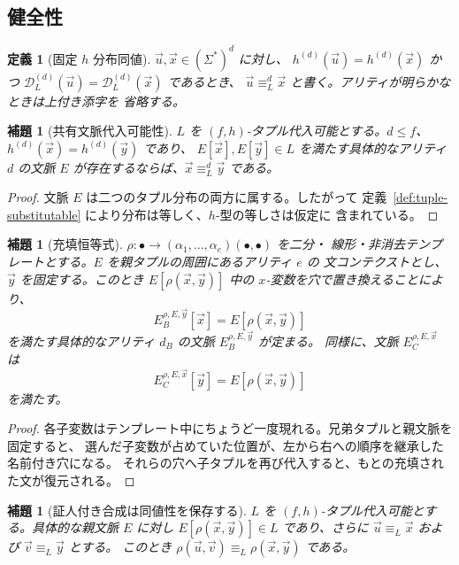 \documentclass[11pt,a4paper]{ltjsarticle}
\newtheorem{lemma}[theorem]{補題}
\newtheorem{definition}[theorem]{定義}
\theoremstyle{remark}
\newcommand{\D}{\mathcal{D}}
\newcommand{\tuple}[1]{\vec{#1}}
\begin{document}
\subsection{健全性}
\label{sec:soundness}

\begin{definition}[固定 \(h\) 分布同値]
\label{def:distributional-equivalence}
\(\tuple u,\tuple x\in(\Sigma^*)^d\) に対し、
\(h^{(d)}(\tuple u)=h^{(d)}(\tuple x)\) かつ
\(\D_L^{(d)}(\tuple u)=\D_L^{(d)}(\tuple x)\) であるとき、
\(\tuple u\equiv_L^d\tuple x\) と書く。アリティが明らかなときは上付き添字を
省略する。
\end{definition}

\begin{lemma}[共有文脈代入可能性]
\label{lem:shared-context}
\(L\) を \((f,h)\)-タプル代入可能とする。\(d\le f\)、
\(h^{(d)}(\tuple x)=h^{(d)}(\tuple y)\) であり、
\(E[\tuple x],E[\tuple y]\in L\) を満たす具体的なアリティ \(d\) の文脈 \(E\)
が存在するならば、\(\tuple x\equiv_L^d\tuple y\) である。
\end{lemma}

\begin{proof}
文脈 \(E\) は二つのタプル分布の両方に属する。したがって
定義~\ref{def:tuple-substitutable} により分布は等しく、\(h\)-型の等しさは仮定に
含まれている。
\end{proof}

\begin{lemma}[充填恒等式]
\label{lem:filling-identity}
\(\rho\colon\bullet\to(\alpha_1,\ldots,\alpha_e)(\bullet,\bullet)\) を二分・
線形・非消去テンプレートとする。\(E\) を親タプルの周囲にあるアリティ \(e\) の
文コンテクストとし、\(\tuple y\) を固定する。このとき
\(E[\rho(\tuple x,\tuple y)]\) 中の \(x\)-変数を穴で置き換えることにより、
\[
E_B^{\rho,E,\tuple y}[\tuple x]=E[\rho(\tuple x,\tuple y)]
\]
を満たす具体的なアリティ \(d_B\) の文脈 \(E_B^{\rho,E,\tuple y}\) が定まる。
同様に、文脈 \(E_C^{\rho,E,\tuple x}\) は
\[
E_C^{\rho,E,\tuple x}[\tuple y]=E[\rho(\tuple x,\tuple y)]
\]
を満たす。
\end{lemma}

\begin{proof}
各子変数はテンプレート中にちょうど一度現れる。兄弟タプルと親文脈を固定すると、
選んだ子変数が占めていた位置が、左から右への順序を継承した名前付き穴になる。
それらの穴へ子タプルを再び代入すると、もとの充填された文が復元される。
\end{proof}

\begin{lemma}[証人付き合成は同値性を保存する]
\label{lem:witnessed-composition}
\(L\) を \((f,h)\)-タプル代入可能とする。具体的な親文脈 \(E\) に対し
\(E[\rho(\tuple x,\tuple y)]\in L\) であり、さらに
\(\tuple u\equiv_L\tuple x\) および \(\tuple v\equiv_L\tuple y\) とする。
このとき
\(\rho(\tuple u,\tuple v)\equiv_L\rho(\tuple x,\tuple y)\) である。
\end{lemma}
\end{document}
